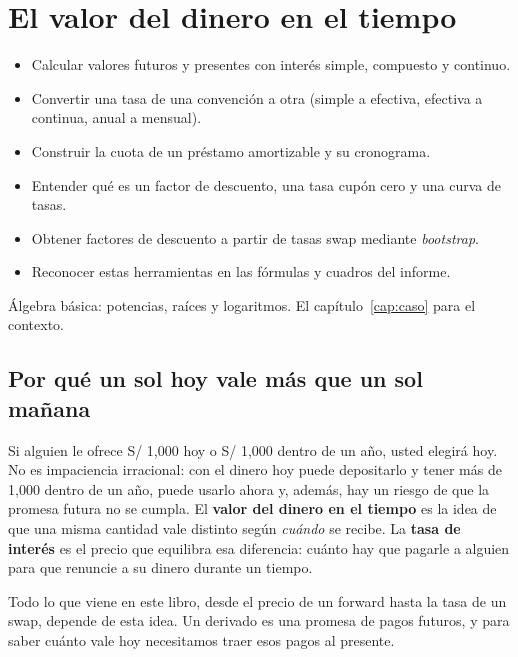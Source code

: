 \chapter{El valor del dinero en el tiempo}\label{cap:tasas}

\begin{objetivos}
\begin{itemize}
\item Calcular valores futuros y presentes con interés simple, compuesto y continuo.
\item Convertir una tasa de una convención a otra (simple a efectiva, efectiva a continua, anual a mensual).
\item Construir la cuota de un préstamo amortizable y su cronograma.
\item Entender qué es un factor de descuento, una tasa cupón cero y una curva de tasas.
\item Obtener factores de descuento a partir de tasas swap mediante \emph{bootstrap}.
\item Reconocer estas herramientas en las fórmulas y cuadros del informe.
\end{itemize}
\end{objetivos}

\begin{prerreq}Álgebra básica: potencias, raíces y logaritmos. El capítulo~\ref{cap:caso} para el contexto.\end{prerreq}

\section{Por qué un sol hoy vale más que un sol mañana}

Si alguien le ofrece S/ 1,000 hoy o S/ 1,000 dentro de un año, usted elegirá hoy. No es impaciencia irracional: con el dinero hoy puede depositarlo y tener más de 1,000 dentro de un año, puede usarlo ahora y, además, hay un riesgo de que la promesa futura no se cumpla. El \textbf{valor del dinero en el tiempo} es la idea de que una misma cantidad vale distinto según \emph{cuándo} se recibe. La \textbf{tasa de interés} es el precio que equilibra esa diferencia: cuánto hay que pagarle a alguien para que renuncie a su dinero durante un tiempo.

Todo lo que viene en este libro, desde el precio de un forward hasta la tasa de un swap, depende de esta idea. Un derivado es una promesa de pagos futuros, y para saber cuánto vale hoy necesitamos traer esos pagos al presente.

